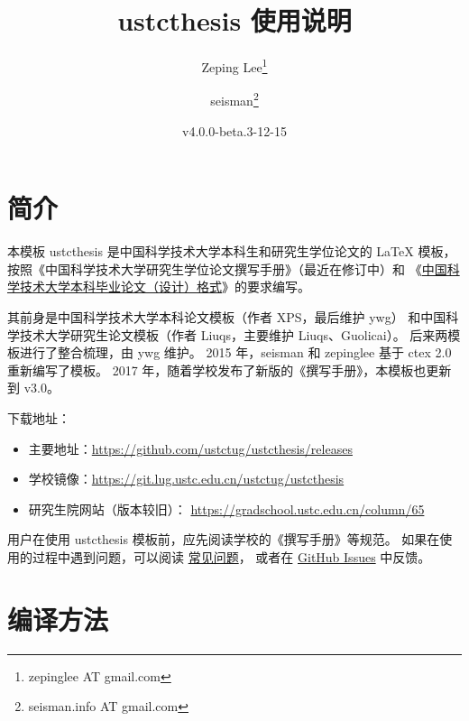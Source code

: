 \documentclass[a4paper]{ltxdoc}
\DeclareRobustCommand\pkg{\textsf}
\DeclareRobustCommand\cls{\textsf}
\begin{document}
\title{\cls{ustcthesis} 使用说明}
\author{Zeping Lee\thanks{zepinglee AT gmail.com} \and
        seisman\thanks{seisman.info AT gmail.com} }
\date{v4.0.0-beta.3-12-15}
\maketitle



\section{简介}

本模板 \cls{ustcthesis} 是中国科学技术大学本科生和研究生学位论文的 \LaTeX{}
模板， 按照《中国科学技术大学研究生学位论文撰写手册》（最近在修订中）和
《\href{https://www.teach.ustc.edu.cn/?attachment_id=13867}
{中国科学技术大学本科毕业论文（设计）格式}》的要求编写。

其前身是中国科学技术大学本科论文模板（作者 XPS，最后维护 ywg）
和中国科学技术大学研究生论文模板（作者 Liuqs，主要维护 Liuqs、Guolicai）。
后来两模板进行了整合梳理，由 ywg 维护。
2015 年，seisman 和 zepinglee 基于 \pkg{ctex} 2.0 重新编写了模板。
2017 年，随着学校发布了新版的《撰写手册》，本模板也更新到 v3.0。

下载地址：
\begin{itemize}
  \item 主要地址：\url{https://github.com/ustctug/ustcthesis/releases}
  \item 学校镜像：\url{https://git.lug.ustc.edu.cn/ustctug/ustcthesis}
  \item 研究生院网站（版本较旧）：
    \url{https://gradschool.ustc.edu.cn/column/65}
\end{itemize}

用户在使用 \pkg{ustcthesis} 模板前，应先阅读学校的《撰写手册》等规范。
如果在使用的过程中遇到问题，可以阅读
\href{https://github.com/ustctug/ustcthesis/wiki}{常见问题}，
或者在 \href{https://github.com/ustctug/ustcthesis/issues}{GitHub Issues}
中反馈。



\section{编译方法}
\end{document}
